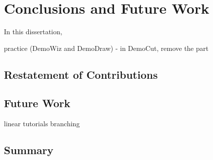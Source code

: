 \chapter{Conclusions and Future Work}

In this dissertation,

practice (DemoWiz and DemoDraw) - in DemoCut, remove the part


\section{Restatement of Contributions}

\section{Future Work}

linear tutorials
branching

\section{Summary}
